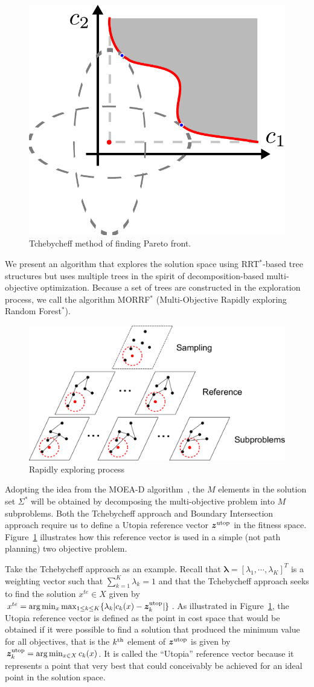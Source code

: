 \documentclass[phd]{byuprop}
\begin{document}
\begin{figure}[htbp]
\centering
\includegraphics[width=0.3\linewidth]{fig/Tchebycheff}
\caption{Tchebycheff method of finding Pareto front.}
\label{fig:Tchebycheff}
\end{figure}

We present an algorithm that explores the solution space using RRT$^{*}$-based tree structures but uses multiple trees in the spirit of decomposition-based multi-objective optimization.
Because a set of trees are constructed in the exploration process, we call the algorithm MORRF$^{*}$ (Multi-Objective Rapidly exploring Random Forest$^{*}$).

\begin{figure}[htbp]
	\centering
	\includegraphics[width=0.55\linewidth]{./fig/MORRTstar}
	\caption{Rapidly exploring process}
	\label{fig:MORRTstar}
\end{figure}

Adopting the idea from the MOEA-D algorithm~\cite{Zhang2007}, the $M$ elements in the solution set $\Sigma^{*}$ will be obtained by decomposing the multi-objective problem into $ M $ subproblems.  
Both the Tchebycheff approach and Boundary Intersection approach require us to define a Utopia reference vector $ \bm{z}^{\rm utop} $ in the fitness space. 
Figure~\ref{fig:Tchebycheff} illustrates how this reference vector is used in a simple (not path planning) two objective problem.  

Take the Tchebycheff approach as an example.
Recall that  $ \bm{\lambda} = [ \lambda_{1} , \cdots , \lambda_{K}  ]^{T} $ is a weighting vector such that $ \sum_{k=1}^{K} \lambda_{k} = 1 $ and that the Tchebycheff approach seeks to find the solution $ x^{te}\in X $ given by $ x^{te} = \arg\min_x \max_{1 \leq k \leq K}  \{ \lambda_{k} | c_{k}(x) - \bm{z}^{\rm utop}_{k}  | \} $.  
As illustrated in Figure~\ref{fig:Tchebycheff}, the Utopia reference vector is defined as the point in cost space that would be obtained if it were possible to find a solution that produced the minimum value for all objectives, that is the $k^{\rm th}$ element of $\bm{z}^{\rm utop}$ is given by $\bm{z}^{\rm utop}_{k} = \arg \min_{x \in X} c_{k}(x)$.  
It is called the ``Utopia'' reference vector because it represents a point that very best that could conceivably be achieved for an ideal point in the solution space.
\end{document}
